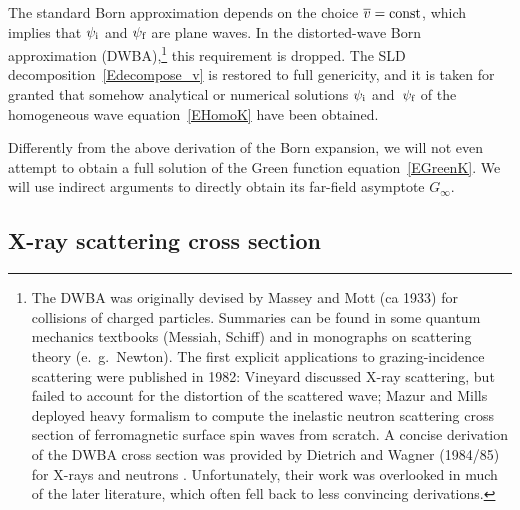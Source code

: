 The standard Born approximation depends on the choice $\mv=\text{const}$,
which implies that $\psi_\si$ and $\psi_\sf$ are plane waves.
In the distorted-wave Born approximation (DWBA),\footnote{
The DWBA was originally devised by Massey and Mott (ca 1933)
for collisions of charged particles.
Summaries can be found in some quantum mechanics textbooks (Messiah, Schiff)
and in monographs on scattering theory (e.~g.\ Newton).
The first explicit applications to grazing-incidence scattering
were published in 1982:
Vineyard \cite{Vin82} discussed X-ray scattering,
but failed to account for the distortion of the scattered wave;
Mazur and Mills \cite{MaMi82} deployed heavy formalism
to compute the inelastic neutron scattering cross section
of ferromagnetic surface spin waves from scratch.
A concise derivation of the DWBA cross section
was provided by Dietrich and Wagner (1984/85)
for X-rays \cite{DiWa84} and neutrons \cite{DiWa85}.
Unfortunately, their work was overlooked in much of the later literature,
which often fell back to less convincing derivations.}
this requirement is dropped.
The SLD decomposition~\cref{Edecompose_v}
is restored to full genericity,
and it is taken for granted
that somehow analytical or numerical solutions $\psi_\si$ and~$\psi_\sf$
of the homogeneous wave equation~\cref{EHomoK}
have been obtained.


Differently from the above derivation of the Born expansion,
we will not even attempt to obtain a full solution
%
of the Green function equation~\cref{EGreenK}.
We will use indirect arguments to directly obtain its far-field asymptote $G_\infty$.


%

\subsection{X-ray scattering cross section}\label{SXscasol}

\def\Ei{\v{E}_\si}
\def\Eic{\Ei^*}
\def\Ef{\v{E}_\sf}
\def\Efc{\Ef^*}
\def\Eo{\TENS{\overset{o}{\v{E}}}}
\def\Efo{\Eo_\sf}
\def\Efoc{\Eo\vphantom{E}^*_\sf}
\def\he{\v{\hat e}}
\def\hef{\he_\sf}
\def\hei{\he_\si}
\def\sif{\text{i,f}}

